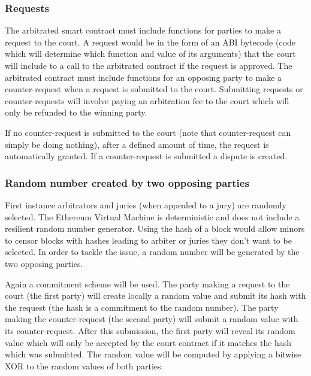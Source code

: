 \documentclass[12 pt]{article}
\begin{document}
\subsubsection{Requests}
The arbitrated smart contract must include functions for parties to make a request to the court. 
A request would be in the form of an ABI bytecode (code which will determine which function and value of its arguments) that the court will include to a call to the arbitrated contract if the request is approved.
The arbitrated contract must include functions for an opposing party to make a counter-request when a request is submitted to the court.
Submitting requests or counter-requests will involve paying an arbitration fee to the court which will only be refunded to the winning party.

If no counter-request is submitted to the court (note that counter-request can simply be doing nothing), after a defined amount of time, the request is automatically granted.
If a counter-request is submitted a dispute is created.

\subsubsection{Random number created by two opposing parties}
First instance arbitrators and juries (when  appealed to a jury) are randomly selected.
The Ethereum Virtual Machine is deterministic and does not include a resilient random number generator. Using the hash of a block would allow minors to censor blocks with hashes leading to arbiter or juries they don't want to be selected.
In order to tackle the issue, a random number will be generated by the two opposing parties.

Again a commitment scheme will be used. The party making a request to the court (the first party) will create locally a random value and submit its hash with the request (the hash is a commitment to the random number).
The party making the counter-request (the second party) will submit a random value with its counter-request.
After this submission, the first party will reveal its random value which will only be accepted by the court contract if it matches the hash which was submitted.
The random value will be computed by applying a bitwise XOR to the random values of both parties.
\end{document}
